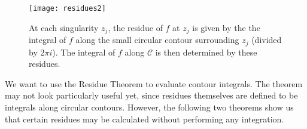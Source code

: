 \begin{figure}[H]
\centering
\texttt{[image: residues2]}
\caption{At each singularity $z_j$, the residue of $f$ at $z_j$ is given by the the integral of $f$ along the small circular contour surrounding $z_j$ (divided by $2\pi i$).  The integral of $f$ along $\mathcal{C}$ is then determined by these residues.}
\end{figure}

We want to use the Residue Theorem to evaluate contour integrals.  The theorem may not look particularly useful yet, since residues themselves are defined to be integrals along circular contours.  However, the following two theorems show us that certain residues may be calculated without performing any integration.



\begin{comment}
\begin{theorem}[Assumption A]
\label{t:assa}
Let $f$ be holomorphic on a region $\mathcal{R}$ and let $z, w \in \mathcal{R}$.  Then
\[
f(z) = f(w) + (z-w) f'(w) + \frac{(z-w)^2}{2!} f''(w) + \ldots + \frac{(z-w)^n}{n!}f^{(n)}(w) + (z-w)^{(n+1)} f_{n+1} (z),
\]
where the function $f_{n+1}$ is holomorphic on $\mathcal{R}$.
\end{theorem}
We make a few observations about Assumption A:
\begin{enumerate}
\item[(i)] Part of Assumption A is the assumption that all derivatives of $f$ exist at $w$.
\item[(ii)] The last term of this sum is $(z-w)^{n+1} f_{n+1} (z)$, and \emph{not} $(z-w)^{n+1} f_{n+1}(w)$.
\item[(iii)] The name $f_{n+1}$ is chosen for convenience - it highlights that the final term depends on our choice of $n$.
\item[(iv)] The assumption is an equality, not an approximation.
\end{enumerate}
\end{comment}

